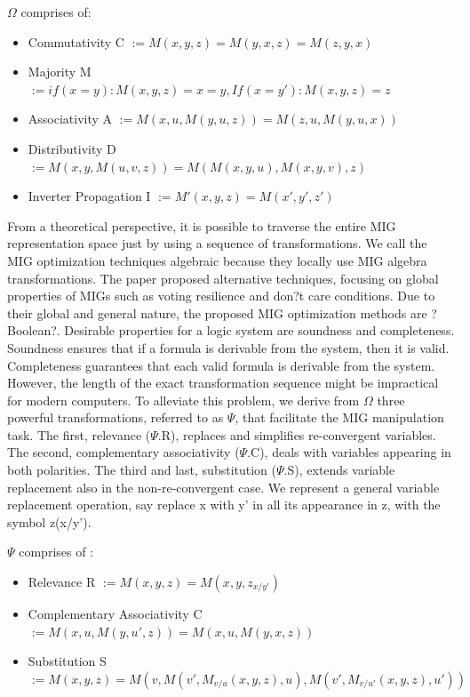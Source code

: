 \documentclass[
	accentcolor=1c,%
	type=intern,
	marginpar=false,
	ruledheaders=section,
	class=report,
	BCOR=5mm,
      parskip=half-,
	fontsize=10pt
	]{tudapub}
\begin{document}
	$\Omega$ comprises of:
	\begin{itemize}
		\item Commutativity C $:= M(x, y, z) = M(y, x, z) = M(z, y, x)$
		\item Majority M $:=  if(x = y): M(x, y, z) = x = y, If(x = y'): M(x, y, z) = z$
		\item Associativity A $:= M (x, u, M(y, u, z)) = M(z, u, M(y, u, x))$
		\item Distributivity D $:= M(x, y, M(u, v, z)) = M(M(x, y, u),M(x, y, v), z)$
		\item Inverter Propagation I $:= M'(x, y, z) = M(x', y', z')$
	\end{itemize}

	From a theoretical perspective, it is possible to traverse the entire MIG representation space just by using a sequence of transformations. We call the MIG optimization techniques algebraic because they locally use MIG algebra transformations. The paper proposed alternative techniques, focusing on global properties of MIGs such as voting resilience and don?t care conditions. Due to their global and general nature, the proposed MIG optimization methods are ?Boolean?. Desirable properties for a logic system are soundness and completeness. Soundness ensures that if a formula is derivable from the system, then it is valid. Completeness guarantees that each valid formula is derivable from the system. However, the length of the exact transformation sequence might be impractical for modern computers.\newline
	\newline
	To alleviate this problem, we derive from $\Omega$ three powerful transformations, referred to as $\Psi$, that facilitate the MIG manipulation task. The first, relevance ($\Psi$.R), replaces and simplifies re-convergent variables. The second, complementary associativity ($\Psi$.C), deals with variables appearing in both polarities. The third and last, substitution ($\Psi$.S), extends variable replacement also in the non-re-convergent case. We represent a general variable replacement operation, say replace x with y' in all its appearance in z, with the symbol z(x/y').

	$\Psi$ comprises of :
	\begin{itemize}
		\item Relevance R $:= M(x, y, z) = M(x, y, z_{x/y'})$
		\item Complementary Associativity C $:= M(x, u, M(y, u', z)) = M(x, u, M(y, x, z))$
		\item Substitution S $:= M(x, y, z) = M(v, M(v', M_{v/u}(x, y, z), u), M(v', M_{v/u'}(x, y, z), u'))$
	\end{itemize}
\end{document}
